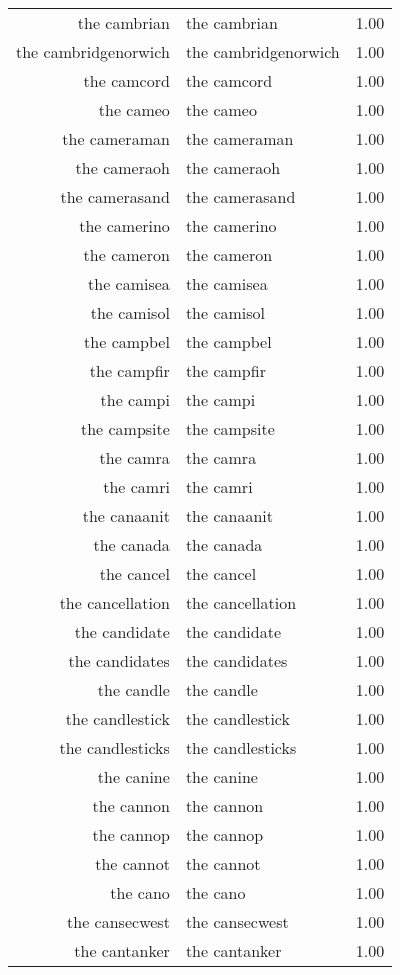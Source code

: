 \begin{table}[ht]
\begin{tabular}{rlr}
  the cambrian & the cambrian & 1.00 \\ 
  the cambridgenorwich & the cambridgenorwich & 1.00 \\ 
  the camcord & the camcord & 1.00 \\ 
  the cameo & the cameo & 1.00 \\ 
  the cameraman & the cameraman & 1.00 \\ 
  the cameraoh & the cameraoh & 1.00 \\ 
  the camerasand & the camerasand & 1.00 \\ 
  the camerino & the camerino & 1.00 \\ 
  the cameron & the cameron & 1.00 \\ 
  the camisea & the camisea & 1.00 \\ 
  the camisol & the camisol & 1.00 \\ 
  the campbel & the campbel & 1.00 \\ 
  the campfir & the campfir & 1.00 \\ 
  the campi & the campi & 1.00 \\ 
  the campsite & the campsite & 1.00 \\ 
  the camra & the camra & 1.00 \\ 
  the camri & the camri & 1.00 \\ 
  the canaanit & the canaanit & 1.00 \\ 
  the canada & the canada & 1.00 \\ 
  the cancel & the cancel & 1.00 \\ 
  the cancellation & the cancellation & 1.00 \\ 
  the candidate & the candidate & 1.00 \\ 
  the candidates & the candidates & 1.00 \\ 
  the candle & the candle & 1.00 \\ 
  the candlestick & the candlestick & 1.00 \\ 
  the candlesticks & the candlesticks & 1.00 \\ 
  the canine & the canine & 1.00 \\ 
  the cannon & the cannon & 1.00 \\ 
  the cannop & the cannop & 1.00 \\ 
  the cannot & the cannot & 1.00 \\ 
  the cano & the cano & 1.00 \\ 
  the cansecwest & the cansecwest & 1.00 \\ 
  the cantanker & the cantanker & 1.00 \\ 

\end{tabular}
\end{table}
